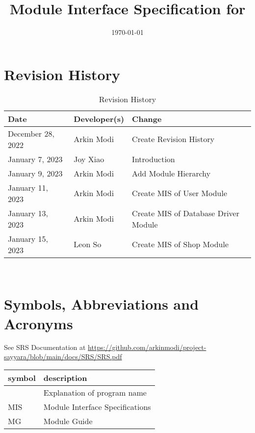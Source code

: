 \documentclass[12pt, titlepage]{article}
\begin{document}
\title{Module Interface Specification for \progname{}}

\author{\authname}

\date{\today}

\maketitle


\section{Revision History}

\begin{table}[hp]
	\caption{Revision History} \label{TblRevisionHistory}
	\begin{tabularx}{\textwidth}{llX}
		\toprule
		\textbf{Date}     & \textbf{Developer(s)} & \textbf{Change}                      \\
		\midrule
		December 28, 2022 & Arkin Modi            & Create Revision History              \\
		January 7, 2023   & Joy Xiao              & Introduction                         \\
		January 9, 2023   & Arkin Modi            & Add Module Hierarchy                 \\
		January 11, 2023  & Arkin Modi            & Create MIS of User Module            \\
		January 13, 2023  & Arkin Modi            & Create MIS of Database Driver Module \\
		January 15, 2023  & Leon So               & Create MIS of Shop Module            \\
		\bottomrule
	\end{tabularx}
\end{table}

~\newpage

\section{Symbols, Abbreviations and Acronyms}

See SRS Documentation at
\url{https://github.com/arkinmodi/project-sayyara/blob/main/docs/SRS/SRS.pdf}


\begin{tabular}{l l}
	\toprule
	\textbf{symbol} & \textbf{description}            \\
	\midrule
	\progname       & Explanation of program name     \\
	MIS             & Module Interface Specifications \\
	MG              & Module Guide                    \\
	\bottomrule
\end{tabular}
\end{document}
